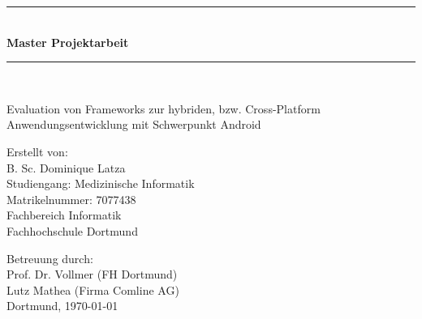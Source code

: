 \newcommand{\HRule}{\rule{\linewidth}					{0.5mm}}

\begin{titlepage}
	\begin{center}

\HRule \\[0.1cm]

\textbf{\large{
Master Projektarbeit
}}

\HRule \\[0.1cm]
\vspace{2.5cm}

\large{}
Evaluation von Frameworks zur hybriden, bzw. Cross-Platform Anwendungsentwicklung mit Schwerpunkt Android
\vspace{2.5cm}

\large{}
Erstellt von:\\
B. Sc. Dominique Latza\\
Studiengang: Medizinische Informatik\\
Matrikelnummer: 7077438\\
Fachbereich Informatik\\
Fachhochschule Dortmund\\
\vspace{1cm}



\vspace{2.5cm}
Betreuung durch:\\
Prof. Dr. Vollmer (FH Dortmund)\\
Lutz Mathea (Firma Comline AG)\\
\vspace{1.3cm}
Dortmund, \today
		
\end{center}
\end{titlepage}